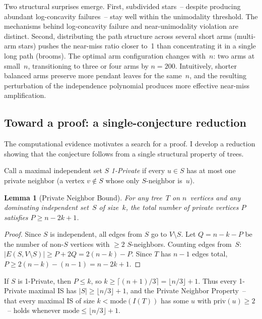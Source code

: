 \documentclass[12pt,oneside]{article}
\newtheorem{lemma}{Lemma}
\theoremstyle{remark}
\begin{document}
Two structural surprises emerge.
First, subdivided stars~-- despite producing abundant log-concavity failures~-- stay well within the unimodality threshold.
The mechanisms behind log-concavity failure and near-unimodality violation are distinct.
Second, distributing the path structure across several short arms (multi-arm stars) pushes the near-miss ratio closer to~1 than concentrating it in a single long path (brooms).
The optimal arm configuration changes with~$n$: two arms at small~$n$, transitioning to three or four arms by $n = 200$.
Intuitively, shorter balanced arms preserve more pendant leaves for the same~$n$, and the resulting perturbation of the independence polynomial produces more effective near-miss amplification.

\subsection*{Toward a proof: a single-conjecture reduction}

The computational evidence motivates a search for a proof.
I develop a reduction showing that the conjecture follows from a single structural property of trees.

Call a maximal independent set $S$ \emph{1-Private} if every $u \in S$ has at most one private neighbor (a vertex $v \notin S$ whose only $S$-neighbor is~$u$).

\begin{lemma}[Private Neighbor Bound]\label{lem:pnb}
  For any tree~$T$ on $n$~vertices and any dominating independent set~$S$ of size~$k$, the total number of private vertices $P$ satisfies $P \ge n - 2k + 1$.
\end{lemma}

\begin{proof}
Since $S$ is independent, all edges from $S$ go to $V \setminus S$.
Let $Q = n - k - P$ be the number of non-$S$ vertices with $\ge 2$ $S$-neighbors.
Counting edges from~$S$: $|E(S, V \setminus S)| \ge P + 2Q = 2(n - k) - P$.
Since $T$ has $n - 1$ edges total, $P \ge 2(n - k) - (n - 1) = n - 2k + 1$.
\end{proof}

If $S$ is 1-Private, then $P \le k$, so $k \ge \lceil(n+1)/3\rceil = \lfloor n/3 \rfloor + 1$.
Thus every 1-Private maximal IS has $|S| \ge \lfloor n/3 \rfloor + 1$, and the Private Neighbor Property~-- that every maximal IS of size $k < \mathrm{mode}(I(T))$ has some $u$ with $\mathrm{priv}(u) \ge 2$~-- holds whenever $\mathrm{mode} \le \lfloor n/3 \rfloor + 1$.
\end{document}
